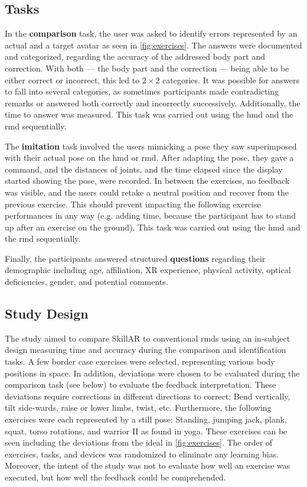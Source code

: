 \subsection{Tasks \label{sec:tasks}}
In the \textbf{comparison} task, the user was asked to identify errors represented by an actual and a target avatar as seen in \autoref{fig:exercises}. The answers were documented and categorized, regarding the accuracy of the addressed body part and correction. With both --- the body part and the correction --- being able to be either correct or incorrect, this led to $2 \times 2$ categories. It was possible for answers to fall into several categories, as sometimes participants made contradicting remarks or answered both correctly and incorrectly successively. Additionally, the time to answer was measured. This task was carried out using the \acrshort{hmd} and the \acrshort{rmd} sequentially.

The \textbf{imitation} task involved the users mimicking a pose they saw superimposed with their actual pose on the \acrshort{hmd} or \acrshort{rmd}. After adapting the pose, they gave a command, and the distances of joints, and the time elapsed since the display started showing the pose, were recorded. In between the exercises, no feedback was visible, and the users could retake a neutral position and recover from the previous exercise. This should prevent impacting the following exercise performances in any way (e.g. adding time, because the participant has to stand up after an exercise on the ground). This task was carried out using the \acrshort{hmd} and the \acrshort{rmd} sequentially.

Finally, the participants answered structured \textbf{questions} regarding their demographic including age, affiliation, XR experience, physical activity, optical deficiencies, gender, and potential comments.

\subsection{Study Design \label{sec:design}}
The study aimed to compare SkillAR to conventional \acrshort{rmd}s using an in-subject design measuring time and accuracy during the comparison and identification tasks. A few border case exercises were selected, representing various body positions in space. In addition, deviations were chosen to be evaluated during the comparison task (see below) to evaluate the feedback interpretation. These deviations require corrections in different directions to correct: Bend vertically, tilt side-wards, raise or lower limbs, twist, etc. Furthermore, the following exercises were each represented by a still pose: Standing, jumping jack, plank, squat, torso rotations, and warrior II as found in yoga. These exercises can be seen including the deviations from the ideal in \autoref{fig:exercises}. The order of exercises, tasks, and devices was randomized to eliminate any learning bias. Moreover, the intent of the study was not to evaluate how well an exercise was executed, but how well the feedback could be comprehended.

